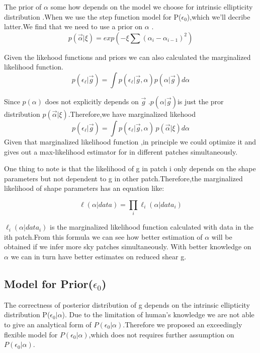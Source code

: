 \documentclass[useAMS,usenatbib]{mn2e}
\begin{document}
The prior of $\alpha$ some how depends on the model we choose for
intrinsic ellipticity distribution .When we use the step function
model for P($\epsilon_{0}$),which we'll decribe latter.We find that
we need to use a prior on $\alpha$ .
\begin{equation}
p(\vec{\alpha}|\xi)=exp(-\xi\sum(\alpha_{i}-\alpha_{i-1})^{2})
\end{equation}


Given the likehood functions and priors we can also calculated the
marginalized likelihood function.
\begin{equation}
p(\epsilon_{\ell}|\vec{g})=\int p(\epsilon_{\ell}|\vec{g},\alpha)p(\alpha|\vec{g})d\alpha
\end{equation}


Since $p(\alpha)$ does not explicitly depends on $\vec{g}$ .$p(\alpha|\vec{g})$is
just the pror distribution $p(\vec{\alpha}|\xi)$.Therefore,we have marginalized likehood
\begin{equation}
p(\epsilon_{\ell}|\vec{g})=\int p(\epsilon_{\ell}|\vec{g},\alpha)\,p(\vec{\alpha}|\xi)d\alpha
\end{equation}
Given that marginalized likelihood function ,in principle we could optimize it  and gives out a max-likelihood estimator 
for  in different patches simultaneously.


One thing to note is that the likelihood of g in patch i only depends
on the shape parameters but not dependent to g in other patch.Therefore,the
marginalized likelihood of shape parameters has an equation like:

\begin{equation}
\ell(\alpha|data)=\prod_{i}\ell_{i}(\alpha|data_{i})
\end{equation}


$\ell_{i}(\alpha|data_{i})$ is the marginalized likelihood function
calculated with data in the ith patch.From this formula we can see
how better estimation of $\alpha$ will be obtained if we infer more
sky patches simultaneously. With better knowledge on $\alpha$ we can
in turn have better estimates on reduced shear g.


\subsection{Model for Prior($\epsilon_{0}$)}

The correctness of posterior distribution of g depends on the intrinsic
ellipticity distribution P($\epsilon_{0}|\alpha$). Due to the limitation
of human's knowledge we are not able to give an analytical form of
$P(\epsilon_{0}|\alpha)$.Therefore we proposed an exceedingly flexible
model for $P(\epsilon_{0}|\alpha)$,which does not requires further
assumption on $P(\epsilon_{0}|\alpha)$.
\end{document}
